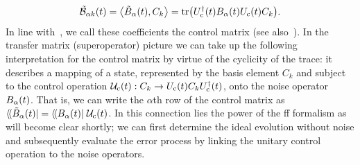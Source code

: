 \begin{equation}\label{eq:ff:control_matrix}
    \ctrlmat_{\alpha k}(t) = \dotHS{\Bat(t)}{C_k}  = \tr(\Uc\adjoint(t)\Ba(t)\Uc(t)C_k).
\end{equation}
In line with~\citet{Green2013}, we call these coefficients the control matrix (see also~).
In the transfer matrix (superoperator) picture we can take up the following interpretation for the control matrix by virtue of the cyclicity of the trace: it describes a mapping of a state, represented by the basis element $C_k$ and subject to the control operation $\mathcal{U}_{\mathrm{c}}(t): C_k\rightarrow U_{\mathrm{c}}(t) C_kU_{\mathrm{c}}^\dagger(t)$, onto the noise operator $B_\alpha(t)$.
That is, we can write the $\alpha$th row of the control matrix as $\dbra*{\Bat(t)} = \dbra{\Ba(t)}\liouvUc(t)$.
In this connection lies the power of the \gls{ff} formalism as will become clear shortly; we can first determine the ideal evolution without noise and subsequently evaluate the error process by linking the unitary control operation to the noise operators.

